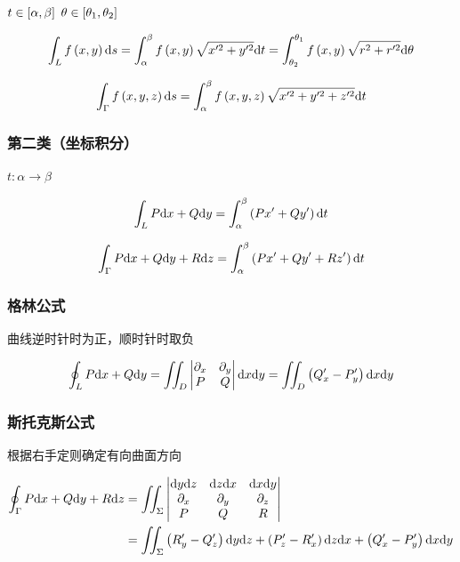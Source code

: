 \documentclass{article}
\begin{document}
$t\in\left[\alpha,\beta\right]$
$\theta\in\left[\theta_1,\theta_2\right]$

\[\int_L f\left(x,y\right)\mathrm d s
    =\int^\beta_\alpha f\left(x,y\right)\sqrt{x^{\prime 2}+y^{\prime 2}}\mathrm d t
    =\int_{\theta_2}^{\theta_1}f\left(x,y\right)\sqrt{r^2+r^{\prime2}}\mathrm d\theta\]

\[\int_\Gamma f\left(x,y,z\right)\mathrm d s
    =\int^\beta_\alpha f\left(x,y,z\right)\sqrt{x^{\prime 2}+y^{\prime 2}+z^{\prime 2}}\mathrm d t\]

\subsubsection{第二类（坐标积分）}

$t:\alpha\to\beta$

\[\int_LP\mathrm d x+Q\mathrm d y=
    \int^\beta_\alpha\left(Px^\prime+Qy^\prime\right)\mathrm d t\]

\[\int_\Gamma P\mathrm d x+Q\mathrm d y+R\mathrm d z=
    \int^\beta_\alpha\left(Px^\prime+Qy^\prime+Rz^\prime\right)\mathrm d t\]

\subsubsection{格林公式}

曲线逆时针时为正，顺时针时取负

\[\oint_LP\mathrm d x+Q\mathrm d y
    =\iint_D\begin{vmatrix}
        \partial_x & \partial_y \\
        P          & Q
    \end{vmatrix}\mathrm d x\mathrm d y
    =\iint_D\left(Q^\prime_x-P^\prime_y\right)\mathrm d x\mathrm d y\]

\subsubsection{斯托克斯公式}

根据右手定则确定有向曲面方向

\[\begin{aligned}
        \oint_\Gamma P\mathrm d x+Q\mathrm d y+R\mathrm d z
         & =\iint_\Sigma\begin{vmatrix}
                            \mathrm d y\mathrm d z   & \mathrm d z\mathrm d x   & \mathrm d x\mathrm d y   \\
                            \partial_x & \partial_y & \partial_z \\
                            P          & Q          & R
                        \end{vmatrix} \\
         & =\iint_\Sigma
        \left(R_y^\prime-Q_z^\prime\right)\mathrm d y\mathrm d z+
        \left(P_z^\prime-R_x^\prime\right)\mathrm d z\mathrm d x+
        \left(Q_x^\prime-P_y^\prime\right)\mathrm d x\mathrm d y
    \end{aligned}\]
\end{document}

